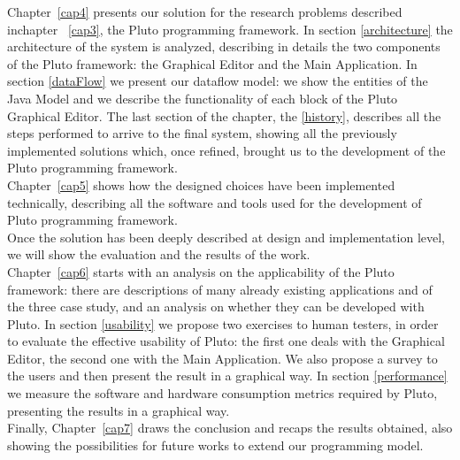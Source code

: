 Chapter~\ref{cap4} presents our solution for the research problems described inchapter ~\ref{cap3}, the Pluto programming framework.
In section \ref{architecture} the architecture of the system is analyzed, describing in details the two components of the Pluto framework:
the Graphical Editor and the Main Application.
In section \ref{dataFlow} we present our dataflow model:
we show the entities of the Java Model and we describe the functionality of each block of the Pluto Graphical Editor.
The last section of the chapter, the \ref{history}, describes all the steps performed to arrive to the final system, showing all the previously implemented solutions which, once refined, brought us to the development of the Pluto programming framework.
\\

Chapter~\ref{cap5} shows how the designed choices have been implemented technically, describing all the software and tools used for the development of Pluto programming framework.
\\

Once the solution has been deeply described at design and implementation level, we will show the evaluation and the results of the work.
\\

Chapter~\ref{cap6} starts with an analysis on the applicability of the Pluto framework:
there are descriptions of many already existing applications and of the three case study, and an analysis on whether they can be developed with Pluto. 
In section \ref{usability} we propose two exercises to human testers, in order to evaluate the effective usability of Pluto:
the first one deals with the Graphical Editor, the second one with the Main Application.
We also propose a survey to the users and then present the result in a graphical way.
In section \ref{performance} we measure the software and hardware consumption metrics required by Pluto, presenting the results in a graphical way.
\\

Finally, Chapter~\ref{cap7} draws the conclusion and recaps the results obtained, also showing the possibilities for future works to extend our programming model.